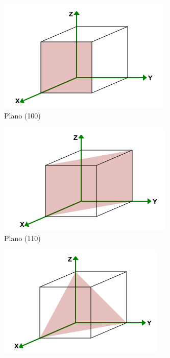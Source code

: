 \documentclass[a4paper]{article}
\begin{document}
\begin{itemize}
\begin{figure}[H]
  \centering
  \begin{subfigure}[b]{0.4\linewidth}
    \includegraphics[width=\linewidth]{miller_sc100.png}
     \caption{Plano (100)}
  \end{subfigure}
  \begin{subfigure}[b]{0.4\linewidth}
    \includegraphics[width=\linewidth]{miller_sc110.png}
    \caption{Plano (110)}
  \end{subfigure}
  \begin{subfigure}[b]{0.4\linewidth}
    \includegraphics[width=\linewidth]{miller_sc111.png}

\end{subfigure}
\end{figure}
\end{itemize}
\end{document}
